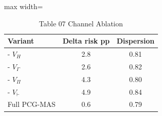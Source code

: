 \begin{table}[tbp]
\centering
\footnotesize
\caption{Table 07 Channel Ablation}
\label{tab:table_07_channel_ablation}
\begin{adjustbox}{max width=\linewidth}
\begin{tabular}{lcc}
\toprule
Variant & Delta risk pp & Dispersion \\
\midrule
- $V_H$ & 2.8 & 0.81 \\
- $V_\Gamma$ & 2.6 & 0.82 \\
- $V_\Pi$ & 4.3 & 0.80 \\
- $V_\vdash$ & 4.9 & 0.84 \\
Full PCG-MAS & 0.6 & 0.79 \\
\bottomrule
\end{tabular}
\end{adjustbox}
\end{table}
